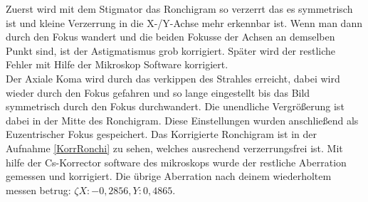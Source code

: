 Zuerst wird mit dem Stigmator das Ronchigram so verzerrt das es symmetrisch ist und kleine Verzerrung in die X-/Y-Achse mehr erkennbar ist. Wenn man dann durch den Fokus wandert und die beiden Fokusse der Achsen an demselben Punkt sind, ist der Astigmatismus grob korrigiert. Später wird der restliche Fehler mit Hilfe der Mikroskop Software korrigiert.\\
Der Axiale Koma wird durch das verkippen des Strahles erreicht, dabei wird wieder durch den Fokus gefahren und so lange eingestellt bis das Bild symmetrisch durch den Fokus durchwandert. Die unendliche Vergrößerung ist dabei in der Mitte des Ronchigram. Diese Einstellungen wurden anschließend als Euzentrischer Fokus gespeichert. Das Korrigierte Ronchigram ist in der Aufnahme \cref{KorrRonchi} zu sehen, welches ausrechend verzerrungsfrei ist. Mit hilfe der Cs-Korrector software des mikroskops wurde der restliche Aberration gemessen und korrigiert. Die übrige Aberration nach deinem wiederholtem messen betrug: \(\zeta X: -0,2856 , Y: 0,4865 \).


